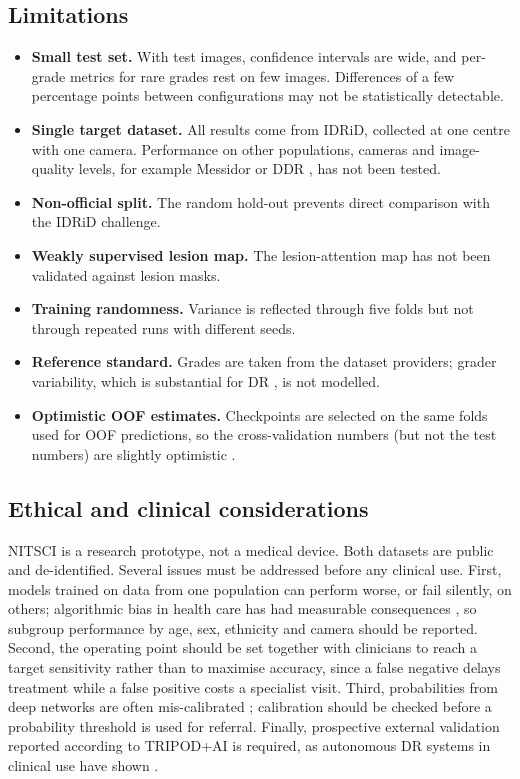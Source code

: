 \subsection{Limitations}
\begin{itemize}
\item \textbf{Small test set.} With  test images, confidence intervals are wide, and per-grade metrics for
  rare grades rest on few images. Differences of a few percentage points between configurations may not be
  statistically detectable.
\item \textbf{Single target dataset.} All results come from IDRiD, collected at one centre with one camera.
  Performance on other populations, cameras and image-quality levels, for example Messidor
  \citep{decenciere2014messidor} or DDR \citep{li2019ddr}, has not been tested.
\item \textbf{Non-official split.} The random hold-out prevents direct comparison with the IDRiD challenge.
\item \textbf{Weakly supervised lesion map.} The lesion-attention map has not been validated against lesion masks.
\item \textbf{Training randomness.} Variance is reflected through five folds but not through repeated runs with
  different seeds.
\item \textbf{Reference standard.} Grades are taken from the dataset providers; grader variability, which is
  substantial for DR \citep{krause2018grader}, is not modelled.
\item \textbf{Optimistic OOF estimates.} Checkpoints are selected on the same folds used for OOF predictions, so the
  cross-validation numbers (but not the test numbers) are slightly optimistic \citep{varma2006bias}.
\end{itemize}

\subsection{Ethical and clinical considerations}
NITSCI is a research prototype, not a medical device. Both datasets are public and de-identified. Several issues must
be addressed before any clinical use. First, models trained on data from one population can perform worse, or fail
silently, on others; algorithmic bias in health care has had measurable consequences \citep{obermeyer2019dissecting},
so subgroup performance by age, sex, ethnicity and camera should be reported. Second, the operating point should be
set together with clinicians to reach a target sensitivity rather than to maximise accuracy, since a false negative
delays treatment while a false positive costs a specialist visit. Third, probabilities from deep networks are often
mis-calibrated \citep{guo2017calibration}; calibration should be checked before a probability threshold is used for
referral. Finally, prospective external validation reported according to TRIPOD+AI \citep{collins2024tripod} is
required, as autonomous DR systems in clinical use have shown \citep{abramoff2018pivotal}.
